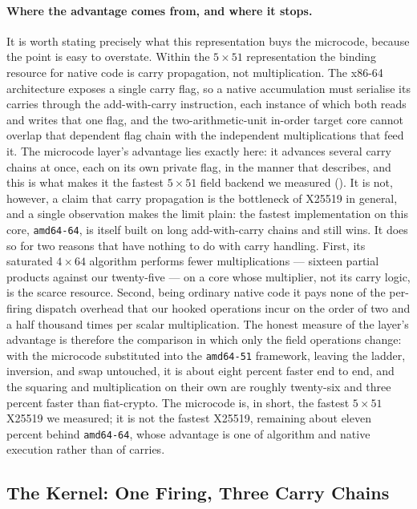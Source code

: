\paragraph{Where the advantage comes from, and where it stops.}
It is worth stating precisely what this representation buys the microcode, because
the point is easy to overstate. Within the $5\times51$ representation the binding
resource for native code is carry propagation, not multiplication. The x86-64
architecture exposes a single carry flag, so a native accumulation must serialise
its carries through the add-with-carry instruction, each instance of which both
reads and writes that one flag, and the two-arithmetic-unit in-order target core
cannot overlap that dependent flag chain with the independent multiplications that
feed it. The microcode layer's advantage lies exactly here: it advances several
carry chains at once, each on its own private flag, in the manner that
 describes, and this is what makes it the fastest
$5\times51$ field backend we measured (). It is not, however,
a claim that carry propagation is the bottleneck of X25519 in general, and a single
observation makes the limit plain: the fastest implementation on this core,
\texttt{amd64-64}, is itself built on long add-with-carry chains and still wins.
It does so for two reasons that have nothing to do with carry handling. First, its
saturated $4\times64$ algorithm performs fewer multiplications --- sixteen partial
products against our twenty-five --- on a core whose multiplier, not its carry
logic, is the scarce resource. Second, being ordinary native code it pays none of
the per-firing dispatch overhead that our hooked operations incur on the order of
two and a half thousand times per scalar multiplication. The honest measure of the
layer's advantage is therefore the comparison in which only the field operations
change: with the microcode substituted into the \texttt{amd64-51} framework, leaving
the ladder, inversion, and swap untouched, it is about eight percent faster end to
end, and the squaring and multiplication on their own are roughly twenty-six and
three percent faster than fiat-crypto. The microcode is, in short, the fastest
$5\times51$ X25519 we measured; it is not the fastest X25519, remaining about eleven
percent behind \texttt{amd64-64}, whose advantage is one of algorithm and native
execution rather than of carries.

\subsection{The Kernel: One Firing, Three Carry Chains}
\label{sec:c25519-kernel}

